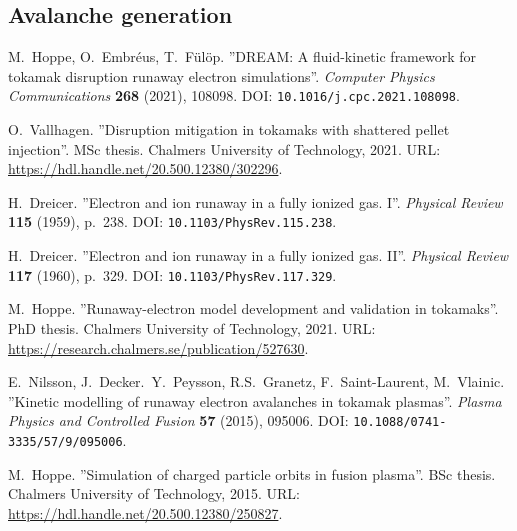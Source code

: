 \documentclass[11pt,a4paper]{article}
\begin{document}
\subsection{Avalanche generation}
\label{sec:avalanche}
\begin{thebibliography}{100}
    M.\ Hoppe, O.\ Embréus, T.\ Fülöp. ''DREAM: A fluid-kinetic framework for tokamak disruption runaway electron simulations''. \textit{Computer Physics Communications} \textbf{268} (2021), 108098. DOI: \texttt{10.1016/j.cpc.2021.108098}.

    O.\ Vallhagen. ''Disruption mitigation in tokamaks with shattered pellet injection''. MSc thesis. Chalmers University of Technology, 2021. URL: \url{https://hdl.handle.net/20.500.12380/302296}.

    H.\ Dreicer. ''Electron and ion runaway in a fully ionized gas. I''. \textit{Physical Review} \textbf{115} (1959), p.\ 238. DOI: \texttt{10.1103/PhysRev.115.238}.

    H.\ Dreicer. ''Electron and ion runaway in a fully ionized gas. II''. \textit{Physical Review} \textbf{117} (1960), p.\ 329. DOI: \texttt{10.1103/PhysRev.117.329}.

    M.\ Hoppe. ''Runaway-electron model development and validation in tokamaks''. PhD thesis. Chalmers University of Technology, 2021. URL: \url{https://research.chalmers.se/publication/527630}.

    E.\ Nilsson, J.\ Decker.\ Y.\ Peysson, R.S.\ Granetz, F.\ Saint-Laurent, M.\ Vlainic. ''Kinetic modelling of runaway electron avalanches in tokamak plasmas''. \textit{Plasma Physics and Controlled Fusion} \textbf{57} (2015), 095006. DOI: \texttt{10.1088/0741-3335/57/9/095006}.


    M.\ Hoppe. ''Simulation of charged particle orbits in fusion plasma''. BSc thesis. Chalmers University of Technology, 2015. URL: \url{https://hdl.handle.net/20.500.12380/250827}.

\end{thebibliography}
\end{document}
